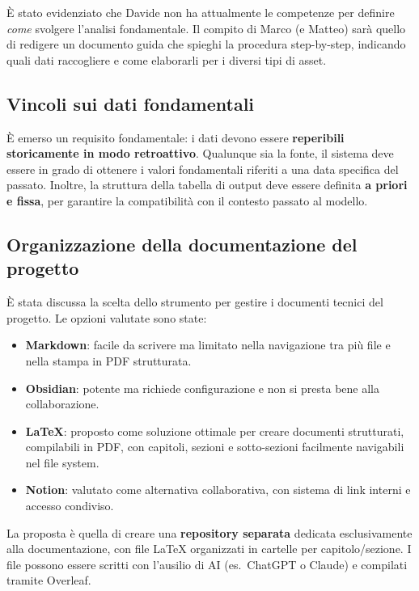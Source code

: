 \documentclass[12pt, a4paper]{article}
\begin{document}
È stato evidenziato che Davide non ha attualmente le competenze per definire \textit{come} svolgere l'analisi fondamentale. Il compito di Marco (e Matteo) sarà quello di redigere un documento guida che spieghi la procedura step-by-step, indicando quali dati raccogliere e come elaborarli per i diversi tipi di asset.

\subsection{Vincoli sui dati fondamentali}

È emerso un requisito fondamentale: i dati devono essere \textbf{reperibili storicamente in modo retroattivo}. Qualunque sia la fonte, il sistema deve essere in grado di ottenere i valori fondamentali riferiti a una data specifica del passato. Inoltre, la struttura della tabella di output deve essere definita \textbf{a priori e fissa}, per garantire la compatibilità con il contesto passato al modello.

\subsection{Organizzazione della documentazione del progetto}

È stata discussa la scelta dello strumento per gestire i documenti tecnici del progetto. Le opzioni valutate sono state:

\begin{itemize}[leftmargin=1.5cm]
  \item \textbf{Markdown}: facile da scrivere ma limitato nella navigazione tra più file e nella stampa in PDF strutturata.
  \item \textbf{Obsidian}: potente ma richiede configurazione e non si presta bene alla collaborazione.
  \item \textbf{LaTeX}: proposto come soluzione ottimale per creare documenti strutturati, compilabili in PDF, con capitoli, sezioni e sotto-sezioni facilmente navigabili nel file system.
  \item \textbf{Notion}: valutato come alternativa collaborativa, con sistema di link interni e accesso condiviso.
\end{itemize}

La proposta è quella di creare una \textbf{repository separata} dedicata esclusivamente alla documentazione, con file \LaTeX{} organizzati in cartelle per capitolo/sezione. I file possono essere scritti con l'ausilio di AI (es.\ ChatGPT o Claude) e compilati tramite Overleaf.
\end{document}
